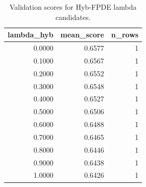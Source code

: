 \begin{table}[t]
\caption{Validation scores for Hyb-FPDE lambda candidates.}
\label{tab:lambda_distribution_computed}
\centering
\begin{tabular}{rrr}
\toprule
lambda\_hyb & mean\_score & n\_rows \\
\midrule
0.0000 & 0.6577 & 1 \\
0.1000 & 0.6567 & 1 \\
0.2000 & 0.6552 & 1 \\
0.3000 & 0.6548 & 1 \\
0.4000 & 0.6527 & 1 \\
0.5000 & 0.6506 & 1 \\
0.6000 & 0.6488 & 1 \\
0.7000 & 0.6465 & 1 \\
0.8000 & 0.6446 & 1 \\
0.9000 & 0.6438 & 1 \\
1.0000 & 0.6426 & 1 \\
\bottomrule
\end{tabular}

\end{table}

